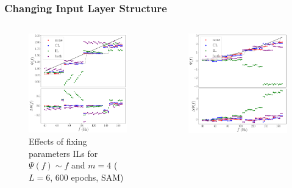 \documentclass{beamer}
\begin{document}
\begin{frame}
\frametitle{Changing Input Layer Structure}
\begin{columns}
\begin{column}{0.5\textwidth}
\begin{figure}
\centering 
\includegraphics[width=\textwidth]{im/phase_RP_comp_linear_m4}
\caption{Effects of fixing parameters ILs for $\Psi(f) \sim f$ and $m=4$ ($L=6$, 600 epochs, SAM)}
\end{figure}
\end{column}
\begin{column}{0.5\textwidth}
\begin{figure}
\centering 
\includegraphics[width=\textwidth]{im/phase_RP_comp_quadratic_m4}

\end{figure}
\end{column}
\end{columns}
\end{frame}
\end{document}
